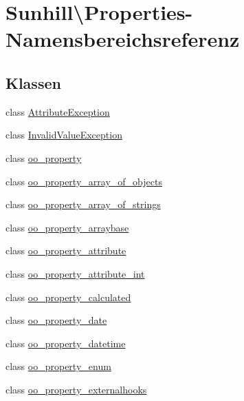 \hypertarget{namespaceSunhill_1_1Properties}{}\section{Sunhill\textbackslash{}Properties-\/\+Namensbereichsreferenz}
\label{namespaceSunhill_1_1Properties}
\subsection*{Klassen}
\begin{DoxyCompactItemize}
\item 
class \hyperlink{classSunhill_1_1Properties_1_1AttributeException}{Attribute\+Exception}
\item 
class \hyperlink{classSunhill_1_1Properties_1_1InvalidValueException}{Invalid\+Value\+Exception}
\item 
class \hyperlink{classSunhill_1_1Properties_1_1oo__property}{oo\+\_\+property}
\item 
class \hyperlink{classSunhill_1_1Properties_1_1oo__property__array__of__objects}{oo\+\_\+property\+\_\+array\+\_\+of\+\_\+objects}
\item 
class \hyperlink{classSunhill_1_1Properties_1_1oo__property__array__of__strings}{oo\+\_\+property\+\_\+array\+\_\+of\+\_\+strings}
\item 
class \hyperlink{classSunhill_1_1Properties_1_1oo__property__arraybase}{oo\+\_\+property\+\_\+arraybase}
\item 
class \hyperlink{classSunhill_1_1Properties_1_1oo__property__attribute}{oo\+\_\+property\+\_\+attribute}
\item 
class \hyperlink{classSunhill_1_1Properties_1_1oo__property__attribute__int}{oo\+\_\+property\+\_\+attribute\+\_\+int}
\item 
class \hyperlink{classSunhill_1_1Properties_1_1oo__property__calculated}{oo\+\_\+property\+\_\+calculated}
\item 
class \hyperlink{classSunhill_1_1Properties_1_1oo__property__date}{oo\+\_\+property\+\_\+date}
\item 
class \hyperlink{classSunhill_1_1Properties_1_1oo__property__datetime}{oo\+\_\+property\+\_\+datetime}
\item 
class \hyperlink{classSunhill_1_1Properties_1_1oo__property__enum}{oo\+\_\+property\+\_\+enum}
\item 
class \hyperlink{classSunhill_1_1Properties_1_1oo__property__externalhooks}{oo\+\_\+property\+\_\+externalhooks}

\end{DoxyCompactItemize}
